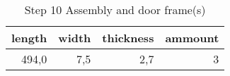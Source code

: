 \begin{table}[h!]
\centering
\caption{Step 10 Assembly and door frame(s)}
\begin{tabular}{rrrr}
\toprule
 length &  width &  thickness &  ammount \\
\midrule
  494,0 &    7,5 &        2,7 &        3 \\
\bottomrule
\end{tabular}
\end{table}

